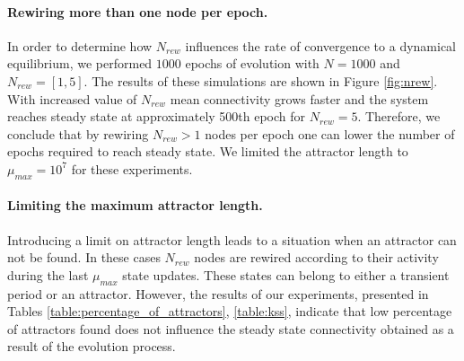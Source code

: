 \documentclass[procedia]{easychair}
\begin{document}
	\paragraph{Rewiring more than one node per epoch.} In order to determine how $N_{rew}$ influences the rate of convergence to a dynamical equilibrium, we performed $1000$ epochs of evolution with $N=1000$ and $N_{rew}=[1, 5]$. The results of these simulations are shown in Figure \ref{fig:nrew}. With increased value of $N_{rew}$ mean connectivity grows faster and the system reaches steady state at approximately 500th epoch for $N_{rew}=5$. Therefore, we conclude that by rewiring $N_{rew} > 1$ nodes per epoch one can lower the number of epochs required to reach steady state. We limited the attractor length to $\mu_{max}=10^7$ for these experiments.
	
	\paragraph{Limiting the maximum attractor length.} Introducing a limit on attractor length leads to a situation when an attractor can not be found. In these cases $N_{rew}$ nodes are rewired according to their activity during the last $\mu_{max}$ state updates. These states can belong to either a transient period or an attractor. However, the results of our experiments, presented in Tables \ref{table:percentage_of_attractors}, \ref{table:kss}, indicate that low percentage of attractors found does not influence the steady state connectivity obtained as a result of the evolution process.
	
\end{document}
